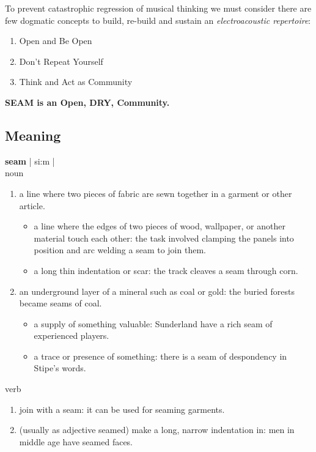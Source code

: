 \documentclass[twoside,a4paper]{article}
\begin{document}
To prevent catastrophic regression of musical thinking we must consider there are few dogmatic concepts to build, re-build and sustain an \emph{electroacoustic repertoire}:
\begin{enumerate}
  \item Open and Be Open
  \item Don't Repeat Yourself
  \item Think and Act as Community
\end{enumerate}

\textbf{SEAM is an Open, DRY, Community.}

\subsection{Meaning}

\textbf{seam} | si:m |\\
noun
\begin{enumerate}
  \item a line where two pieces of fabric are sewn together in a garment or other article.    
    \begin{itemize}
      \item a line where the edges of two pieces of wood, wallpaper, or another material touch each other: the task involved clamping the panels into position and arc welding a seam to join them.
      \item a long thin indentation or scar: the track cleaves a seam through corn.
    \end{itemize}
  \item an underground layer of a mineral such as coal or gold: the buried forests became seams of coal.
    \begin{itemize}
      \item a supply of something valuable: Sunderland have a rich seam of experienced players.
      \item a trace or presence of something: there is a seam of despondency in Stipe's words.    
    \end{itemize}
\end{enumerate}

verb
\begin{enumerate}
  \item join with a seam: it can be used for seaming garments.
  \item (usually as adjective seamed) make a long, narrow indentation in: men in middle age have seamed faces.
\end{enumerate}
\end{document}
